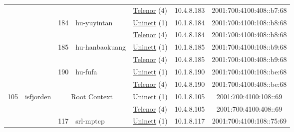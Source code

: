 \begin{small}
\begin{center}
\begin{longtable}{|c|c|c|c|c|c|c|c|}
  &  &  &  & \multicolumn{2}{|c|}{\tiny{\href{https://www.telenor.no}{Telenor} (4)}} & \tiny{10.4.8.183} & \tiny{2001:700:4100:408::b7:68} \\* \cline{3-3}\cline{4-4}\cline{5-5}\cline{6-6}\cline{7-7}\cline{8-8}
  &  & \multirow{2}{*}{\tiny{184}} & \multicolumn{1}{|l|}{\multirow{2}{*}{\tiny{hu-yuyintan}}} & \multicolumn{2}{|c|}{\tiny{\href{https://www.uninett.no}{Uninett} (1)}} & \tiny{10.1.8.184} & \tiny{2001:700:4100:108::b8:68} \\* \cline{5-5}\cline{6-6}\cline{7-7}\cline{8-8}
  &  &  &  & \multicolumn{2}{|c|}{\tiny{\href{https://www.telenor.no}{Telenor} (4)}} & \tiny{10.4.8.184} & \tiny{2001:700:4100:408::b8:68} \\* \cline{3-3}\cline{4-4}\cline{5-5}\cline{6-6}\cline{7-7}\cline{8-8}
  &  & \multirow{2}{*}{\tiny{185}} & \multicolumn{1}{|l|}{\multirow{2}{*}{\tiny{hu-hanbaokuang}}} & \multicolumn{2}{|c|}{\tiny{\href{https://www.uninett.no}{Uninett} (1)}} & \tiny{10.1.8.185} & \tiny{2001:700:4100:108::b9:68} \\* \cline{5-5}\cline{6-6}\cline{7-7}\cline{8-8}
  &  &  &  & \multicolumn{2}{|c|}{\tiny{\href{https://www.telenor.no}{Telenor} (4)}} & \tiny{10.4.8.185} & \tiny{2001:700:4100:408::b9:68} \\* \cline{3-3}\cline{4-4}\cline{5-5}\cline{6-6}\cline{7-7}\cline{8-8}
  &  & \multirow{2}{*}{\tiny{190}} & \multicolumn{1}{|l|}{\multirow{2}{*}{\tiny{hu-fufa}}} & \multicolumn{2}{|c|}{\tiny{\href{https://www.uninett.no}{Uninett} (1)}} & \tiny{10.1.8.190} & \tiny{2001:700:4100:108::be:68} \\* \cline{5-5}\cline{6-6}\cline{7-7}\cline{8-8}
  &  &  &  & \multicolumn{2}{|c|}{\tiny{\href{https://www.telenor.no}{Telenor} (4)}} & \tiny{10.4.8.190} & \tiny{2001:700:4100:408::be:68} \\ \hline
 \multirow{26}{*}{\tiny{105}} & \multicolumn{1}{|l|}{\multirow{26}{*}{\tiny{isfjorden}}} & \multicolumn{2}{|c|}{\multirow{2}{*}{\tiny{Root Context}}} & \multicolumn{2}{|c|}{\tiny{\href{https://www.uninett.no}{Uninett} (1)}} & \tiny{10.1.8.105} & \tiny{2001:700:4100:108::69} \\* \cline{5-5}\cline{6-6}\cline{7-7}\cline{8-8}
  &  & \multicolumn{2}{|c|}{} & \multicolumn{2}{|c|}{\tiny{\href{https://www.telenor.no}{Telenor} (4)}} & \tiny{10.4.8.105} & \tiny{2001:700:4100:408::69} \\* \cline{3-3}\cline{4-4}\cline{5-5}\cline{6-6}\cline{7-7}\cline{8-8}
  &  & \multirow{2}{*}{\tiny{117}} & \multicolumn{1}{|l|}{\multirow{2}{*}{\tiny{srl-mptcp}}} & \multicolumn{2}{|c|}{\tiny{\href{https://www.uninett.no}{Uninett} (1)}} & \tiny{10.1.8.117} & \tiny{2001:700:4100:108::75:69} \\* \cline{5-5}\cline{6-6}\cline{7-7}\cline{8-8}

\end{longtable}
\end{center}
\end{small}
